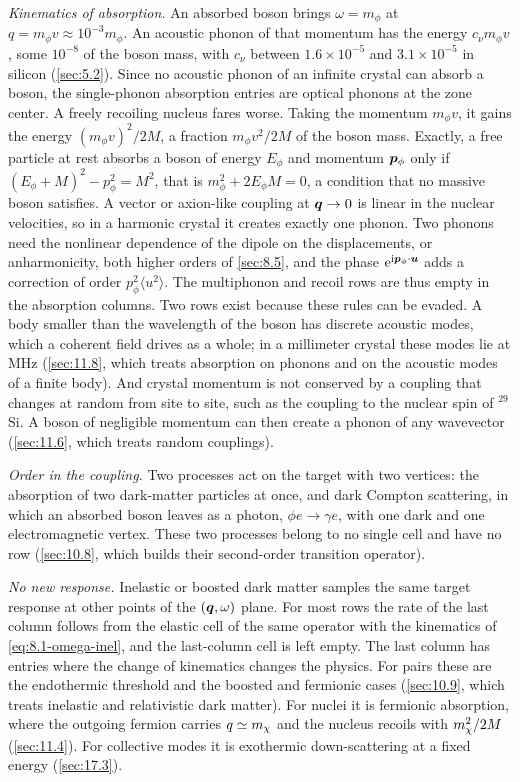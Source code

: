 \emph{Kinematics of absorption.} An absorbed boson brings $\omega = m_\phi$ at $q = m_\phi v \approx 10^{-3}m_\phi$. An acoustic phonon of that momentum has the energy $c_\nu m_\phi v$, some $10^{-8}$ of the boson mass, with $c_\nu$ between $1.6\times10^{-5}$ and $3.1\times10^{-5}$ in silicon (\cref{sec:5.2}). Since no acoustic phonon of an infinite crystal can absorb a boson, the single-phonon absorption entries are optical phonons at the zone center. A freely recoiling nucleus fares worse. Taking the momentum $m_\phi v$, it gains the energy $(m_\phi v)^2/2M$, a fraction $m_\phi v^2/2M$ of the boson mass. Exactly, a free particle at rest absorbs a boson of energy $E_\phi$ and momentum $\bm{p}_\phi$ only if $(E_\phi + M)^2 - p_\phi^2 = M^2$, that is $m_\phi^2 + 2E_\phi M = 0$, a condition that no massive boson satisfies. A vector or axion-like coupling at $\bm{q} \to 0$ is linear in the nuclear velocities, so in a harmonic crystal it creates exactly one phonon. Two phonons need the nonlinear dependence of the dipole on the displacements, or anharmonicity, both higher orders of \cref{sec:8.5}, and the phase $\mathrm{e}^{\mathrm{i}\bm{p}_\phi\cdot\bm{u}}$ adds a correction of order $p_\phi^2\langle u^2\rangle$. The multiphonon and recoil rows are thus empty in the absorption columns. Two rows exist because these rules can be evaded. A body smaller than the wavelength of the boson has discrete acoustic modes, which a coherent field drives as a whole; in a millimeter crystal these modes lie at MHz (\cref{sec:11.8}, which treats absorption on phonons and on the acoustic modes of a finite body). And crystal momentum is not conserved by a coupling that changes at random from site to site, such as the coupling to the nuclear spin of $^{29}$Si. A boson of negligible momentum can then create a phonon of any wavevector (\cref{sec:11.6}, which treats random couplings).

\emph{Order in the coupling.} Two processes act on the target with two vertices: the absorption of two dark-matter particles at once, and dark Compton scattering, in which an absorbed boson leaves as a photon, $\phi e \to \gamma e$, with one dark and one electromagnetic vertex. These two processes belong to no single cell and have no row (\cref{sec:10.8}, which builds their second-order transition operator).

\emph{No new response.} Inelastic or boosted dark matter samples the same target response at other points of the $(\bm{q},\omega)$ plane. For most rows the rate of the last column follows from the elastic cell of the same operator with the kinematics of \cref{eq:8.1-omega-inel}, and the last-column cell is left empty. The last column has entries where the change of kinematics changes the physics. For pairs these are the endothermic threshold and the boosted and fermionic cases (\cref{sec:10.9}, which treats inelastic and relativistic dark matter). For nuclei it is fermionic absorption, where the outgoing fermion carries $q \simeq m_{\chi}$ and the nucleus recoils with $m_{\chi}^2/2M$ (\cref{sec:11.4}). For collective modes it is exothermic down-scattering at a fixed energy (\cref{sec:17.3}).


